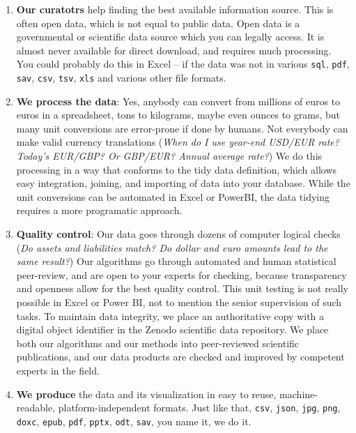 \documentclass[
  a4paper,
  openany, a4paper, oneside]{book}
\begin{document}
\begin{enumerate}
\def\labelenumi{\arabic{enumi}.}
\item
  \textbf{Our curatotrs} help finding the best available information source. This is often open data, which is not equal to public data. Open data is a governmental or scientific data source which you can legally access. It is almost never available for direct download, and requires much processing. You could probably do this in Excel -- if the data was not in various \texttt{sql}, \texttt{pdf}, \texttt{sav}, \texttt{csv}, \texttt{tsv}, \texttt{xls} and various other file formats.
\item
  \textbf{We process the data}: Yes, anybody can convert from millions of euros to euros in a spreadsheet, tons to kilograms, maybe even ounces to grams, but many unit conversions are error-prone if done by humans. Not everybody can make valid currency translations (\emph{When do I use year-end USD/EUR rate? Today's EUR/GBP? Or GBP/EUR? Annual average rate?}) We do this processing in a way that conforms to the tidy data definition, which allows easy integration, joining, and importing of data into your database. While the unit conversions can be automated in Excel or PowerBI, the data tidying requires a more programatic approach.
\item
  \textbf{Quality control}: Our data goes through dozens of computer logical checks (\emph{Do assets and liabilities match? Do dollar and euro amounts lead to the same result?}) Our algorithms go through automated and human statistical peer-review, and are open to your experts for checking, because transparency and openness allow for the best quality control. This unit testing is not really possible in Excel or Power BI, not to mention the senior supervision of such tasks. To maintain data integrity, we place an authoritative copy with a digital object identifier in the Zenodo scientific data repository. We place both our algorithms and our methods into peer-reviewed scientific publications, and our data products are checked and improved by competent experts in the field.
\item
  \textbf{We produce} the data and its visualization in easy to reuse, machine-readable, platform-independent formats. Just like that, \texttt{csv}, \texttt{json}, \texttt{jpg}, \texttt{png}, \texttt{doxc}, \texttt{epub}, \texttt{pdf}, \texttt{pptx}, \texttt{odt}, \texttt{sav}, you name it, we do it.
\end{enumerate}
\end{document}
